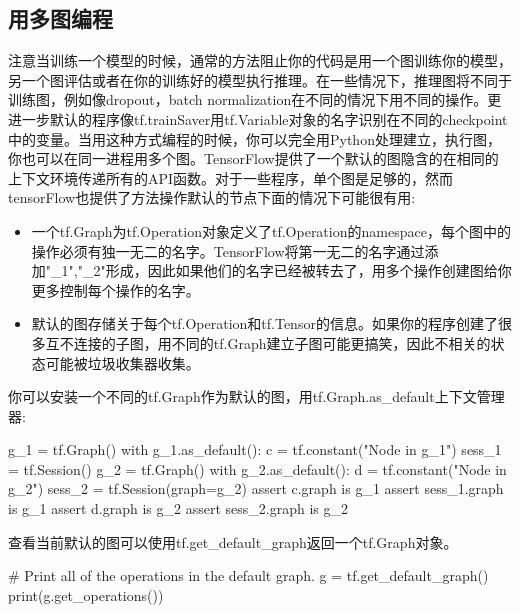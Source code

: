 \subsection{用多图编程}
注意当训练一个模型的时候，通常的方法阻止你的代码是用一个图训练你的模型，另一个图评估或者在你的训练好的模型执行推理。在一些情况下，推理图将不同于训练图，例如像dropout，batch normalization在不同的情况下用不同的操作。更进一步默认的程序像tf.trainSaver用tf.Variable对象的名字识别在不同的checkpoint中的变量。当用这种方式编程的时候，你可以完全用Python处理建立，执行图，你也可以在同一进程用多个图。TensorFlow提供了一个默认的图隐含的在相同的上下文环境传递所有的API函数。对于一些程序，单个图是足够的，然而tensorFlow也提供了方法操作默认的节点下面的情况下可能很有用:
\begin{itemize}
	\item 一个tf.Graph为tf.Operation对象定义了tf.Operation的namespace，每个图中的操作必须有独一无二的名字。TensorFlow将第一无二的名字通过添加"\_1","\_2"形成，因此如果他们的名字已经被转去了，用多个操作创建图给你更多控制每个操作的名字。
	\item 默认的图存储关于每个tf.Operation和tf.Tensor的信息。如果你的程序创建了很多互不连接的子图，用不同的tf.Graph建立子图可能更搞笑，因此不相关的状态可能被垃圾收集器收集。
\end{itemize}
你可以安装一个不同的tf.Graph作为默认的图，用tf.Graph.as\_default上下文管理器:
\begin{python}
g_1 = tf.Graph()
with g_1.as_default():
    c = tf.constant("Node in g_1")
    sess_1 = tf.Session()
g_2 = tf.Graph()
with g_2.as_default():
    d = tf.constant("Node in g_2")
sess_2 = tf.Session(graph=g_2)
assert c.graph is g_1
assert sess_1.graph is g_1
assert d.graph is g_2
assert sess_2.graph is g_2
\end{python}
查看当前默认的图可以使用tf.get\_default\_graph返回一个tf.Graph对象。
\begin{python}
# Print all of the operations in the default graph.
g = tf.get_default_graph()
print(g.get_operations())
\end{python}
